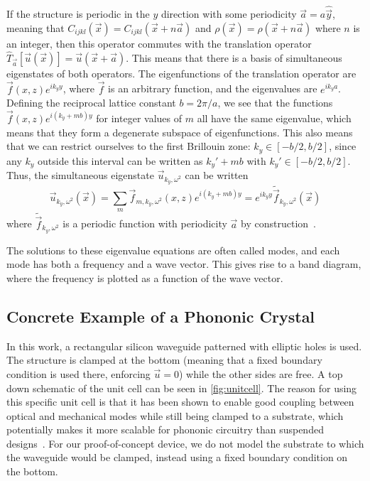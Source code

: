 If the structure is periodic in the $y$ direction with some periodicity
$\vec a = a \hat{\vec y}$,
meaning that $C_{ijkl}(\vec x) = C_{ijkl}(\vec x + n \vec a)$ and $\rho(\vec x)
= \rho(\vec x + n \vec a)$ where $n$ is an
integer, then this operator commutes with the translation operator
$\hat T_{\vec a}[\vec u(\vec x)] = \vec u(\vec x + \vec a)$.
This means that there is a basis of simultaneous eigenstates of both operators.
The eigenfunctions of the translation operator are
$\vec f(x, z)e^{i k_y y}$, where $\vec f$ is an arbitrary function,
and the eigenvalues are $e^{i k_y a}$.
Defining the reciprocal lattice constant $b = 2 \pi / a$, we see
that the functions $\vec f(x, z) e^{i (k_y + m b) y}$ for integer values
of $m$ all have the same eigenvalue, which means that they form a degenerate
subspace of eigenfunctions.
This also means that we can restrict ourselves to the first Brillouin zone:
$k_y \in [-b/2, b/2]$,
since any $k_y$ outside this interval can be written as $k_y' + mb$ with
$k_y' \in [-b/2, b/2]$.
Thus, the simultaneous eigenstate $\vec u_{k_y, \omega^2}$ can be written
\begin{equation}
	\vec u_{k_y, \omega^2}(\vec x) = \sum_m \vec f_{m,k_y,\omega^2}(x, z) e^{i (k_y + m b) y}
	= e^{i k_y y} \tilde{\vec f}_{k_y, \omega^2}(\vec x)
\end{equation}
where $\tilde{\vec f}_{k_y, \omega^2}$ is a periodic function with periodicity
$\vec a$ by construction~\cite{joannopoulos2008photonic}.

The solutions to these eigenvalue equations are often called modes, and each
mode has both a frequency and a wave vector. This gives rise to a band diagram,
where the frequency is plotted as a function of the wave vector.

\subsection{Concrete Example of a Phononic Crystal}

In this work, a rectangular silicon waveguide patterned with elliptic holes is used.
The structure is clamped at the bottom (meaning that a fixed boundary
condition is used there, enforcing $\vec u = 0$) while the other sides are free.
A top down schematic of the unit cell can be seen in \cref{fig:unitcell}.
The reason for using this specific unit cell is that it has been shown to
enable good coupling between optical and mechanical modes while still being
clamped to a substrate,
which potentially makes it more scalable for phononic circuitry than suspended
designs~\cite{kolvik_clamped_2023}.
For our proof-of-concept device, we do not model the substrate to which the
waveguide would be clamped, instead using a fixed boundary condition on the
bottom.

